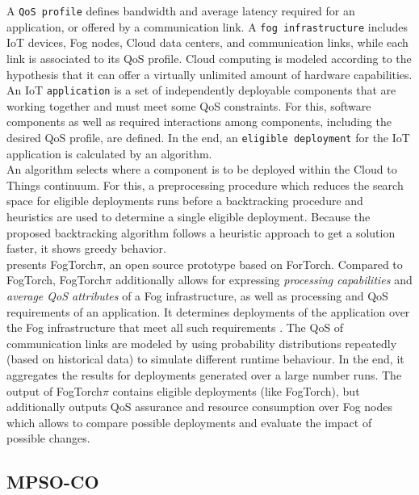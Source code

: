 A \texttt{QoS profile} defines bandwidth and average latency required for an application, or offered by a communication link. A \texttt{fog infrastructure} includes IoT devices, Fog nodes, Cloud data centers, and communication links, while each link is associated to its QoS profile. Cloud computing is modeled according to the hypothesis that it can offer a virtually unlimited amount of hardware capabilities. An IoT \texttt{application} is a set of independently deployable components that are working together and must meet some QoS constraints. For this, software components as well as required interactions among components, including the desired QoS profile, are defined. In the end, an \texttt{eligible deployment} for the IoT application is calculated by an algorithm.\\

An algorithm selects where a component is to be deployed within the Cloud to Things continuum. For this, a preprocessing procedure which reduces the search space for eligible deployments runs before a backtracking procedure and heuristics are used to determine a single eligible deployment. Because the proposed backtracking algorithm follows a heuristic approach to get a solution faster, it shows greedy behavior.\\

\cite{fogtorchpi} presents FogTorch$\pi$, an open source prototype based on ForTorch\cite{fogtorch}.
Compared to FogTorch, FogTorch$\pi$ additionally allows for expressing \textit{processing capabilities} and \textit{average QoS attributes} of a Fog infrastructure, as well as processing and QoS requirements of an application.
It determines deployments of the application over the Fog infrastructure that meet all such requirements \cite{fogtorchpi}.
The QoS of communication links are modeled by using probability distributions repeatedly (based on historical data) to simulate different runtime behaviour.
In the end, it aggregates the results for deployments generated over a large number runs.
The output of FogTorch$\pi$ contains eligible deployments (like FogTorch), but additionally outputs QoS assurance and resource consumption over Fog nodes which allows to compare possible deployments and evaluate the impact of possible changes.

\subsection*{MPSO-CO}

